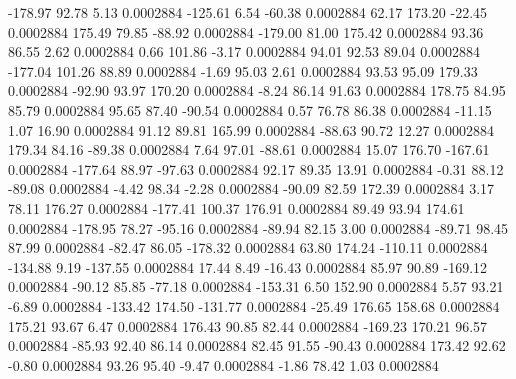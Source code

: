      -178.97       92.78        5.13     0.0002884
     -125.61        6.54      -60.38     0.0002884
       62.17      173.20      -22.45     0.0002884
      175.49       79.85      -88.92     0.0002884
     -179.00       81.00      175.42     0.0002884
       93.36       86.55        2.62     0.0002884
        0.66      101.86       -3.17     0.0002884
       94.01       92.53       89.04     0.0002884
     -177.04      101.26       88.89     0.0002884
       -1.69       95.03        2.61     0.0002884
       93.53       95.09      179.33     0.0002884
      -92.90       93.97      170.20     0.0002884
       -8.24       86.14       91.63     0.0002884
      178.75       84.95       85.79     0.0002884
       95.65       87.40      -90.54     0.0002884
        0.57       76.78       86.38     0.0002884
      -11.15        1.07       16.90     0.0002884
       91.12       89.81      165.99     0.0002884
      -88.63       90.72       12.27     0.0002884
      179.34       84.16      -89.38     0.0002884
        7.64       97.01      -88.61     0.0002884
       15.07      176.70     -167.61     0.0002884
     -177.64       88.97      -97.63     0.0002884
       92.17       89.35       13.91     0.0002884
       -0.31       88.12      -89.08     0.0002884
       -4.42       98.34       -2.28     0.0002884
      -90.09       82.59      172.39     0.0002884
        3.17       78.11      176.27     0.0002884
     -177.41      100.37      176.91     0.0002884
       89.49       93.94      174.61     0.0002884
     -178.95       78.27      -95.16     0.0002884
      -89.94       82.15        3.00     0.0002884
      -89.71       98.45       87.99     0.0002884
      -82.47       86.05     -178.32     0.0002884
       63.80      174.24     -110.11     0.0002884
     -134.88        9.19     -137.55     0.0002884
       17.44        8.49      -16.43     0.0002884
       85.97       90.89     -169.12     0.0002884
      -90.12       85.85      -77.18     0.0002884
     -153.31        6.50      152.90     0.0002884
        5.57       93.21       -6.89     0.0002884
     -133.42      174.50     -131.77     0.0002884
      -25.49      176.65      158.68     0.0002884
      175.21       93.67        6.47     0.0002884
      176.43       90.85       82.44     0.0002884
     -169.23      170.21       96.57     0.0002884
      -85.93       92.40       86.14     0.0002884
       82.45       91.55      -90.43     0.0002884
      173.42       92.62       -0.80     0.0002884
       93.26       95.40       -9.47     0.0002884
       -1.86       78.42        1.03     0.0002884
